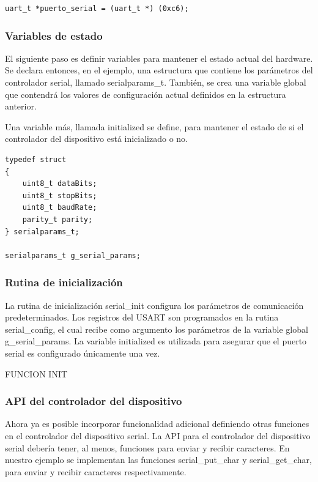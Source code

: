 \documentclass[12pt]{article}
\begin{document}
\begin{verbatim}
uart_t *puerto_serial = (uart_t *) (0xc6);
\end{verbatim}


\subsubsection *{Variables de estado}

El siguiente paso es definir variables para mantener el estado actual
del hardware. Se declara entonces, en el ejemplo, una estructura
que contiene los parámetros del controlador serial, llamado serialparams\_t.
También, se crea una variable global que contendrá los valores 
de configuración actual definidos en la estructura anterior.

Una variable más, llamada initialized se define, para mantener el estado 
de si el 
controlador del dispositivo está inicializado o no.

\begin{verbatim}
typedef struct
{
    uint8_t dataBits;
    uint8_t stopBits;
    uint8_t baudRate;
    parity_t parity;
} serialparams_t;

serialparams_t g_serial_params;
\end{verbatim}


\subsubsection *{Rutina de inicialización}

La rutina de inicialización serial\_init configura los parámetros de comunicación
predeterminados.
Los registros del USART son programados en la rutina serial\_config, el
cual recibe como argumento los parámetros de la variable global g\_serial\_params.
La variable initialized es utilizada para asegurar que el puerto
serial es configurado únicamente una vez.


FUNCION INIT


\subsubsection *{API del controlador del dispositivo}


Ahora ya es posible incorporar funcionalidad adicional definiendo otras
funciones en el controlador del dispositivo serial.
La API para el controlador del dispositivo serial debería tener, al menos,
funciones para enviar y recibir caracteres. En nuestro ejemplo
se implementan las funciones serial\_put\_char y serial\_get\_char, 
para enviar y recibir caracteres respectivamente.
\end{document}
